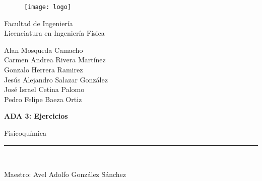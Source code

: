 \documentclass[12pt]{article}
\begin{document}
	\begin{titlepage}
		
		\begin{center}
			\vspace*{-1in}
			\begin{figure}[htb]
				\begin{center}
					\texttt{[image: logo]}
				\end{center}
			\end{figure}
			
			Facultad de Ingeniería\\
			\vspace*{0.15in}
			Licenciatura en Ingeniería Física \\
			\vspace*{0.2in}
			\begin{large}
				Alan Mosqueda Camacho\\
				Carmen Andrea Rivera Martínez\\
				Gonzalo Herrera Ramirez\\
				Jesús Alejandro Salazar González\\
				José Israel Cetina Palomo\\
				Pedro Felipe Baeza Ortiz\\
			\end{large}
			\vspace*{0.2in}
			\begin{Large}
				\textbf{ADA 3: Ejercicios} \\
			\end{Large}
			\vspace*{0.2in}
			\begin{large}
				Fisicoquímica \\
			\end{large}
			\vspace*{0.3in}
			\rule{80mm}{0.1mm}\\
			\vspace*{0.1in}
			\begin{large}
				Maestro: Avel Adolfo González Sánchez\\
			\end{large}
		\end{center}
		
	\end{titlepage}
\end{document}

